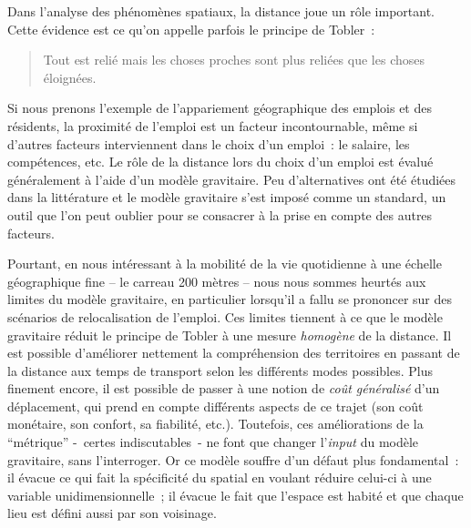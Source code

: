 \documentclass[
  10pt,
  a4paper,
  numbers=noendperiod,
  DIV=9]{scrartcl}
\begin{document}
Dans l'analyse des phénomènes spatiaux, la distance joue un rôle
important. Cette évidence est ce qu'on appelle parfois le principe de
Tobler~:

\begin{quote}
Tout est relié mais les choses proches sont plus reliées que les choses
éloignées.
\end{quote}

Si nous prenons l'exemple de l'appariement géographique des emplois et
des résidents, la proximité de l'emploi est un facteur incontournable,
même si d'autres facteurs interviennent dans le choix d'un emploi~: le
salaire, les compétences, etc. Le rôle de la distance lors du choix d'un
emploi est évalué généralement à l'aide d'un modèle gravitaire. Peu
d'alternatives ont été étudiées dans la littérature et le modèle
gravitaire s'est imposé comme un standard, un outil que l'on peut
oublier pour se consacrer à la prise en compte des autres facteurs.

Pourtant, en nous intéressant à la mobilité de la vie quotidienne à une
échelle géographique fine -- le carreau 200 mètres -- nous nous sommes
heurtés aux limites du modèle gravitaire, en particulier lorsqu'il a
fallu se prononcer sur des scénarios de relocalisation de l'emploi. Ces
limites tiennent à ce que le modèle gravitaire réduit le principe de
Tobler à une mesure \emph{homogène} de la distance. Il est possible
d'améliorer nettement la compréhension des territoires en passant de la
distance aux temps de transport selon les différents modes possibles.
Plus finement encore, il est possible de passer à une notion de
\emph{coût généralisé} d'un déplacement, qui prend en compte différents
aspects de ce trajet (son coût monétaire, son confort, sa fiabilité,
etc.). Toutefois, ces améliorations de la ``métrique'' -~certes
indiscutables~- ne font que changer l'\emph{input} du modèle gravitaire,
sans l'interroger. Or ce modèle souffre d'un défaut plus fondamental~:
il évacue ce qui fait la spécificité du spatial en voulant réduire
celui-ci à une variable unidimensionnelle~; il évacue le fait que
l'espace est habité et que chaque lieu est défini aussi par son
voisinage.
\end{document}
